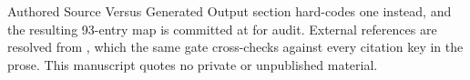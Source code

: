 \documentclass[
  ignorenonframetext,
]{beamer}
\begin{document}
\begin{frame}{Authored Source Versus Generated
Output}
section hard-codes one instead, and the resulting 93-entry map is
committed at  for audit.
External references are resolved from
, which the same gate cross-checks
against every citation key in the prose. This manuscript quotes no
private or unpublished material.
\end{frame}
\end{document}
